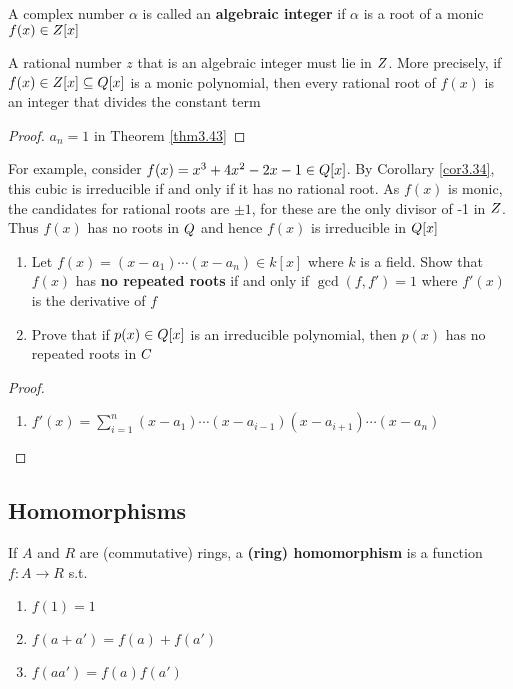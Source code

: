 \documentclass[11pt]{article}
\begin{document}
\begin{definition}[]
A complex number \(\alpha\) is called an \textbf{algebraic integer} if \(\alpha\) is a root of a monic
\(f(x)\in\relax{Z}[x]\)
\end{definition}

\begin{corollary}[]
\label{cor3.44}
A rational number \(z\) that is an algebraic integer must lie in \(\relax{Z}\). More
precisely, if \(f(x)\in\relax{Z}[x]\subseteq\relax{Q}[x]\) is a monic polynomial, then
every rational root of \(f(x)\) is an integer that divides the constant term
\end{corollary}

\begin{proof}
\(a_n=1\) in Theorem \ref{thm3.43}
\end{proof}

For example, consider \(f(x)=x^3+4x^2-2x-1\in\relax{Q}[x]\). By Corollary
\ref{cor3.34}, this cubic is irreducible if and only if it has no rational
root. As \(f(x)\) is monic, the candidates for rational roots are \(\pm 1\),
for these are the only divisor of -1 in \(\relax{Z}\). Thus \(f(x)\) has no roots in
\(\relax{Q}\) and hence \(f(x)\) is irreducible in \(\relax{Q}[x]\)

\begin{exercise}
\label{ex3.37}
\begin{enumerate}
\item Let \(f(x)=(x-a_1)\cdots(x-a_n)\in k[x]\) where \(k\) is a field. Show that
\(f(x)\) has \textbf{no repeated roots} if and only if \(\gcd(f,f')=1\) where
\(f'(x)\) is the derivative of \(f\)
\item Prove that if \(p(x)\in\relax{Q}[x]\) is an irreducible polynomial, then \(p(x)\)
has no repeated roots in \(\relax{C}\)
\end{enumerate}
\end{exercise}

\begin{proof}
\begin{enumerate}
\item \(f'(x)=\sum_{i=1}^n(x-a_1)\cdots(x-a_{i-1})(x-a_{i+1})\cdots(x-a_n)\)
\end{enumerate}
\end{proof}
\subsection{Homomorphisms}
\label{sec:org83eb540}
\begin{definition}[]
If \(A\) and \(R\) are (commutative) rings, a \textbf{(ring) homomorphism} is a function
\(f:A\to R\) s.t.
\begin{enumerate}
\item \(f(1)=1\)
\item \(f(a+a')=f(a)+f(a')\)
\item \(f(aa')=f(a)f(a')\)
\end{enumerate}
\end{definition}
\end{document}
